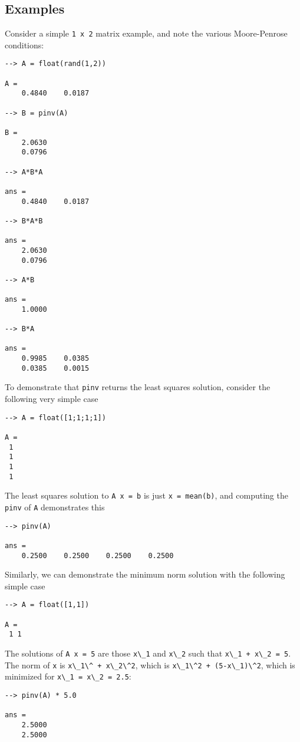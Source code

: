 \subsection{Examples}

Consider a simple \verb|1 x 2| matrix example, and note the various
Moore-Penrose conditions:
\begin{verbatim}
--> A = float(rand(1,2))

A = 
    0.4840    0.0187 

--> B = pinv(A)

B = 
    2.0630 
    0.0796 

--> A*B*A

ans = 
    0.4840    0.0187 

--> B*A*B

ans = 
    2.0630 
    0.0796 

--> A*B

ans = 
    1.0000 

--> B*A

ans = 
    0.9985    0.0385 
    0.0385    0.0015 
\end{verbatim}
To demonstrate that \verb|pinv| returns the least squares solution,
consider the following very simple case
\begin{verbatim}
--> A = float([1;1;1;1])

A = 
 1 
 1 
 1 
 1 
\end{verbatim}
The least squares solution to \verb|A x = b| is just \verb|x = mean(b)|,
and computing the \verb|pinv| of \verb|A| demonstrates this
\begin{verbatim}
--> pinv(A)

ans = 
    0.2500    0.2500    0.2500    0.2500 
\end{verbatim}
Similarly, we can demonstrate the minimum norm solution with
the following simple case
\begin{verbatim}
--> A = float([1,1])

A = 
 1 1 
\end{verbatim}
The solutions of \verb|A x = 5| are those \verb|x\_1| and \verb|x\_2| such that
\verb|x\_1 + x\_2 = 5|.  The norm of \verb|x| is \verb|x\_1\^ + x\_2\^2|, which is
\verb|x\_1\^2 + (5-x\_1)\^2|, which is minimized for \verb|x\_1 = x\_2 = 2.5|:
\begin{verbatim}
--> pinv(A) * 5.0

ans = 
    2.5000 
    2.5000 
\end{verbatim}
